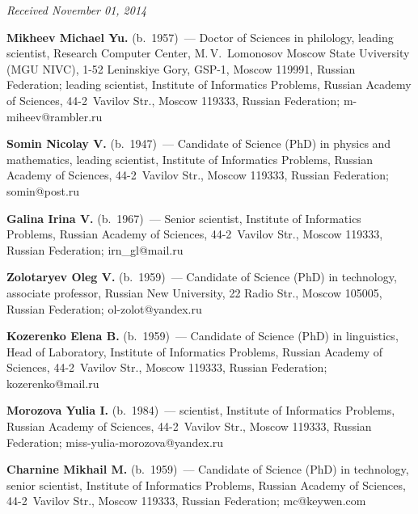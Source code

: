 \vspace*{-12pt}

\hfill{\small\textit{Received November 01, 2014}}




\Contr

\noindent
\textbf{Mikheev Michael Yu.} (b.\ 1957)~--- Doctor of Sciences in philology,
leading scientist, Research Computer Center, M.\,V.~Lomonosov Moscow State
Uviversity (MGU NIVC),  1-52  Leninskiye Gory, GSP-1, Moscow 119991, Russian Federation;
leading scientist, Institute of Informatics Problems, Russian
Academy of Sciences, 44-2~Vavilov Str., Moscow 119333, Russian Federation;
m-miheev@rambler.ru


\vspace*{3pt}

\noindent
\textbf{Somin Nicolay V.} (b.\ 1947)~--- Candidate of Science (PhD) in physics
and mathematics, leading scientist, Institute of Informatics Problems, Russian
Academy of Sciences, 44-2~Vavilov Str., Moscow 119333, Russian Federation;
somin@post.ru

\vspace*{3pt}

\noindent
\textbf{Galina Irina V.} (b.\ 1967)~--- Senior scientist, Institute of Informatics
Problems, Russian Academy of Sciences, 44-2~Vavilov Str., Moscow 119333,
Russian Federation; irn\_gl@mail.ru

\vspace*{3pt}

\noindent
\textbf{Zolotaryev Oleg V.} (b.\ 1959)~--- Candidate of Science (PhD) in
technology, associate professor, Russian New University, 22 Radio Str., Moscow
105005, Russian Federation; ol-zolot@yandex.ru

\vspace*{3pt}

\noindent
\textbf{Kozerenko Elena B.} (b.\ 1959)~--- Candidate of Science (PhD) in
linguistics, Head of Laboratory, Institute of Informatics Problems, Russian
Academy of Sciences, 44-2~Vavilov Str., Moscow 119333, Russian Federation;
kozerenko@mail.ru

\vspace*{3pt}

\noindent
\textbf{Morozova Yulia I.} (b.\ 1984)~--- scientist, Institute of Informatics
Problems, Russian Academy of Sciences, 44-2~Vavilov Str., Moscow
119333, Russian Federation; miss-yulia-morozova@yandex.ru

\vspace*{3pt}

\noindent
\textbf{Charnine Mikhail M.} (b.\ 1959)~--- Candidate of Science (PhD) in
technology, senior scientist, Institute of Informatics Problems, Russian Academy
of Sciences, 44-2~Vavilov Str., Moscow 119333, Russian Federation;
mc@keywen.com


\label{end\stat}

\renewcommand{\bibname}{\protect\rm Литература}